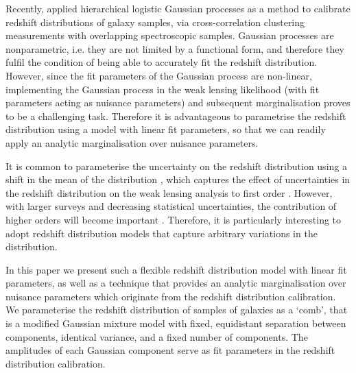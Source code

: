 \documentclass{aa}
\begin{document}
 Recently, \cite{2020MNRAS.491.4768R} applied hierarchical logistic Gaussian processes as a method to calibrate redshift distributions of galaxy samples, via cross-correlation clustering measurements with overlapping spectroscopic samples. Gaussian processes are nonparametric, i.e. they are not limited by a functional form, and therefore they fulfil the condition of being able to accurately fit the redshift distribution. However, since the fit parameters of the Gaussian process are non-linear, implementing the Gaussian process in the weak lensing likelihood (with fit parameters acting as nuisance parameters) and subsequent marginalisation proves to be a challenging task. Therefore it is advantageous to parametrise the redshift distribution using a model with linear fit parameters, so that we can readily apply an analytic marginalisation over nuisance parameters.
 
It is common to parameterise the uncertainty on the redshift distribution using a shift in the mean of the distribution \citep{hildebrandt18, hildebrandt20, HSC2, DES3}, which captures the effect of uncertainties in the redshift distribution on the weak lensing analysis to first order \citep{amara}. However, with larger surveys and decreasing statistical uncertainties, the contribution of higher orders will become important \citep{wright_som}. Therefore, it is particularly interesting to adopt redshift distribution models that capture arbitrary variations in the distribution.

In this paper we present such a flexible redshift distribution model with linear fit parameters, as well as a technique that provides an analytic marginalisation over nuisance parameters which originate from the redshift distribution calibration. We parameterise the redshift distribution of samples of galaxies as a `comb', that is a modified Gaussian mixture model with fixed, equidistant separation between components, identical variance, and a fixed number of components. The amplitudes of each Gaussian component serve as fit parameters in the redshift distribution calibration. 
\end{document}
